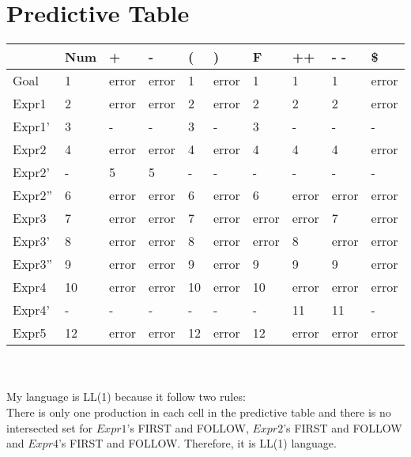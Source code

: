 \documentclass{article}
\begin{document}
\section*{Predictive Table}
\begin{tabular}{a|a|a|a|a|a|a|a|a|a}
\hline
&Num&+&-&(&)&F&++&- -&\$\\
\hline
Goal&1&error&error&1&error&1&1&1&error\\
\hline
Expr1&2&error&error&2&error&2&2&2&error\\
\hline
Expr1'&3&-&-&3&-&3&-&-&-\\
\hline
Expr2&4&error&error&4&error&4&4&4&error\\
\hline
Expr2'&-&5&5&-&-&-&-&-&-\\
\hline
Expr2''&6&error&error&6&error&6&error&error&error\\
\hline
Expr3&7&error&error&7&error&error&error&7&error\\
\hline
Expr3'&8&error&error&8&error&error&8&error&error\\
\hline
Expr3''&9&error&error&9&error&9&9&9&error\\
\hline
Expr4&10&error&error&10&error&10&error&error&error\\
\hline
Expr4'&-&-&-&-&-&-&11&11&-\\
\hline
Expr5&12&error&error&12&error&12&error&error&error\\
\hline
\end{tabular}
\\
\\
My language is LL(1) because it follow two rules:\\
There is only one production in each cell in the predictive table and there is no intersected set for $Expr1$'s FIRST and FOLLOW, $Expr2$'s FIRST and FOLLOW and $Expr4$'s FIRST and FOLLOW. Therefore, it is LL(1) language.\\
\end{document}
